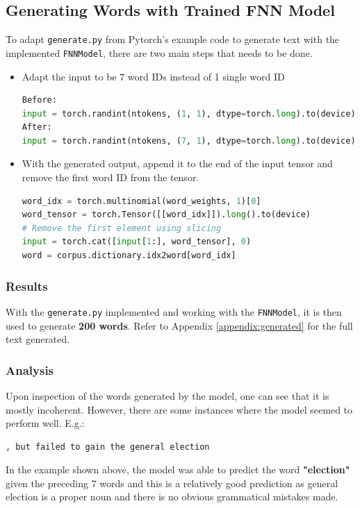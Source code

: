 \documentclass[sigconf,nonacm=true]{acmart}
\begin{document}
\subsection{Generating Words with Trained FNN Model}
To adapt \verb|generate.py| from Pytorch's example code to generate text with the implemented \verb|FNNModel|, there are two main steps that needs to be done.
\begin{itemize}
	\item Adapt the input to be 7 word IDs instead of 1 single word ID
	
	\begin{lstlisting}[language=python]
Before:
input = torch.randint(ntokens, (1, 1), dtype=torch.long).to(device)
After:
input = torch.randint(ntokens, (7, 1), dtype=torch.long).to(device)
	\end{lstlisting}
	
	\item With the generated output, append it to the end of the input tensor and remove the first word ID from the tensor.
	\begin{lstlisting}[language=python]
word_idx = torch.multinomial(word_weights, 1)[0]
word_tensor = torch.Tensor([[word_idx]]).long().to(device)
# Remove the first element using slicing
input = torch.cat([input[1:], word_tensor], 0)
word = corpus.dictionary.idx2word[word_idx]
	\end{lstlisting}
\end{itemize} 

\subsubsection{Results}
With the \verb|generate.py| implemented and working with the \verb|FNNModel|, it is then used to generate \textbf{200 words}. Refer to Appendix \ref{appendix:generated} for the full text generated.

\subsubsection{Analysis}
Upon inspection of the words generated by the model, one can see that it is mostly incoherent. However, there are some instances where the model seemed to perform well.
E.g.:

\begin{lstlisting}
, but failed to gain the general election
\end{lstlisting}

In the example shown above, the model was able to predict the word \textbf{"election"} given the preceding 7 words and this is a relatively good prediction as general election is a proper noun and there is no obvious grammatical mistakes made. 
\end{document}
